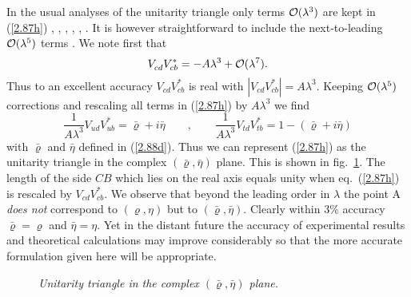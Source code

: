 In the usual analyses of the unitarity triangle only terms ${\cal
O}(\lambda^3)$ are kept in (\ref{2.87h}) \cite{burasharlander:92},
\cite{nir:74}, \cite{harrisrosner:92}, \cite{schmidtlerschubert:92},
\cite{dibdunietzgilman:90}, \cite{alilondon:95}. It is however
straightforward to include the next-to-leading ${\cal O}(\lambda^5)$
terms \cite{burasetal:94b}. We note first that
\begin{equation}\label{2.88a}
V_{cd}^{}V_{cb}^*=-A\lambda^3+{\cal O}(\lambda^7).
\end{equation}
%
Thus to an excellent accuracy $V_{cd}^{}V_{cb}^*$ is real with
$| V_{cd}^{}V_{cb}^*|=A\lambda^3$.
Keeping ${\cal O}(\lambda^5)$ corrections and rescaling all terms in
(\ref{2.87h})
by $A \lambda^3$ 
we find
\begin{equation}\label{2.88b}
 \frac{1}{A\lambda^3}V_{ud}^{}V_{ub}^*
=\bar\varrho+i\bar\eta
\qquad,
\qquad
 \frac{1}{A\lambda^3}V_{td}^{}V_{tb}^*
=1-(\bar\varrho+i\bar\eta)
\end{equation}
with $\bar\varrho$ and $\bar\eta$ defined in (\ref{2.88d}). 
Thus we can represent (\ref{2.87h}) as the unitarity triangle 
in the complex $(\bar\varrho,\bar\eta)$
plane. This is  shown in fig.~\ref{fig:triangle}.
 The length of the side $CB$ which lies
on the real axis equals unity when eq.~(\ref{2.87h}) is rescaled by
$V_{cd}^{}V_{cb}^*$. We observe that beyond the leading order
in $\lambda$ the point A {\it does not} correspond to  $(\varrho,\eta)$ but to
 $(\bar\varrho,\bar\eta)$.
Clearly within 3\% accuracy $\bar\varrho=\varrho$ and $\bar\eta=\eta$.
Yet in the distant future the accuracy of experimental results and
theoretical calculations may improve considerably so that the more
accurate formulation given here will be appropriate.

\begin{figure}[htb]
\vspace{0.05in}
\centerline{
\epsfysize=1.5in
}
\vspace{0.05in}
\caption[]{\small\sl
Unitarity triangle in the complex $(\bar\varrho,\bar\eta)$ plane.
\label{fig:triangle}}
\end{figure}
 
